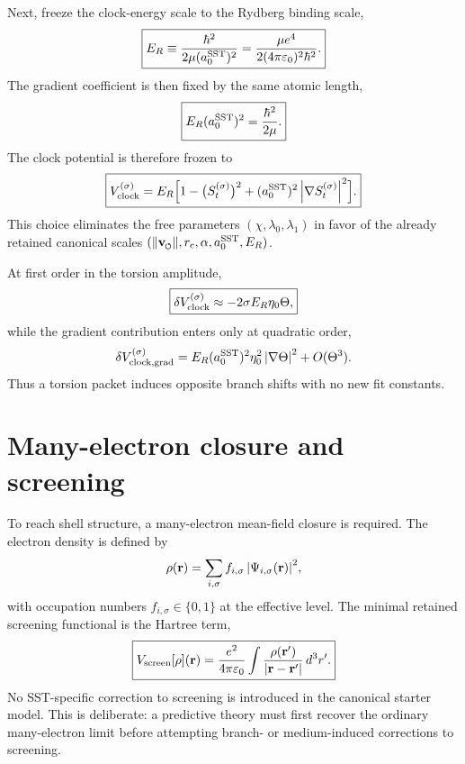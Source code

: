 \documentclass[11pt,a4paper]{article}
\newcommand{\swirlarrow}{\mathchoice{\mkern-2mu\scriptstyle\boldsymbol{\circlearrowleft}}{\mkern-2mu\scriptstyle\boldsymbol{\circlearrowleft}}{\mkern-2mu\scriptscriptstyle\boldsymbol{\circlearrowleft}}{\mkern-2mu\scriptscriptstyle\boldsymbol{\circlearrowleft}}}
\newcommand{\vswirl}{\mathbf{v}_{\swirlarrow}}
\newcommand{\rc}{r_c}
\begin{document}
Next, freeze the clock-energy scale to the Rydberg binding scale,
\begin{equation}
\label{eq:ERfreeze}
\boxed{
E_R \equiv \frac{\hbar^2}{2\mu (a_0^{\rm SST})^2}
= \frac{\mu e^4}{2(4\pi\varepsilon_0)^2\hbar^2}.
}
\end{equation}
The gradient coefficient is then fixed by the same atomic length,
\begin{equation}
\label{eq:lambda1freeze}
\boxed{
E_R (a_0^{\rm SST})^2 = \frac{\hbar^2}{2\mu}.
}
\end{equation}
The clock potential is therefore frozen to
\begin{equation}
\label{eq:Vclock}
\boxed{
V_{\rm clock}^{(\sigma)}
=
E_R\Bigl[1-\bigl(S_t^{(\sigma)}\bigr)^2 + (a_0^{\rm SST})^2\,\abs{\nabla S_t^{(\sigma)}}^2\Bigr].
}
\end{equation}
This choice eliminates the free parameters $(\chi,\lambda_0,\lambda_1)$ in favor of the already retained canonical scales $(\lVert\vswirl\rVert,\rc,\alpha,a_0^{\rm SST},E_R)$.

At first order in the torsion amplitude,
\begin{equation}
\label{eq:Vclock-linear}
\boxed{
\delta V_{\rm clock}^{(\sigma)}
\approx
-2\sigma E_R\eta_0\Theta,
}
\end{equation}
while the gradient contribution enters only at quadratic order,
\begin{equation}
\label{eq:Vclock-grad2}
\delta V_{\rm clock,grad}^{(\sigma)}
= E_R (a_0^{\rm SST})^2\eta_0^2\,\abs{\nabla\Theta}^2 + O(\Theta^3).
\end{equation}
Thus a torsion packet induces opposite branch shifts with no new fit constants.

\section{Many-electron closure and screening}
To reach shell structure, a many-electron mean-field closure is required. The electron density is defined by
\begin{equation}
\label{eq:rho-def}
\rho(\mathbf r)=\sum_{i,\sigma} f_{i,\sigma}\,\abs{\Psi_{i,\sigma}(\mathbf r)}^2,
\end{equation}
with occupation numbers $f_{i,\sigma}\in\{0,1\}$ at the effective level. The minimal retained screening functional is the Hartree term,
\begin{equation}
\label{eq:Vscreen}
\boxed{
V_{\rm screen}[\rho](\mathbf r)
=
\frac{e^2}{4\pi\varepsilon_0}
\int \frac{\rho(\mathbf r')}{\abs{\mathbf r-\mathbf r'}}\,d^3r'.
}
\end{equation}
No SST-specific correction to screening is introduced in the canonical starter model. This is deliberate: a predictive theory must first recover the ordinary many-electron limit before attempting branch- or medium-induced corrections to screening.
\end{document}
